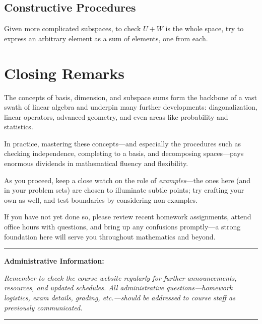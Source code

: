 \documentclass[11pt]{article}
\theoremstyle{definition}
\theoremstyle{plain}
\newenvironment{administrativeblock}
  {\begin{center}\begin{minipage}{0.95\linewidth}\color{blue}\hrule\vspace{2pt}\noindent\textbf{Administrative Information:}\par}
  {\vspace{2pt}\hrule\end{minipage}\end{center}}
\begin{document}
\subsection{Constructive Procedures}
Given more complicated subspaces, to check $U + W$ is the whole space, try to express an arbitrary element as a sum of elements, one from each.

\section*{Closing Remarks}

The concepts of basis, dimension, and subspace sums form the backbone of a vast swath of linear algebra and underpin many further developments: diagonalization, linear operators, advanced geometry, and even areas like probability and statistics.

In practice, mastering these concepts—and especially the procedures such as checking independence, completing to a basis, and decomposing spaces—pays enormous dividends in mathematical fluency and flexibility.

As you proceed, keep a close watch on the role of \emph{examples}—the ones here (and in your problem sets) are chosen to illuminate subtle points; try crafting your own as well, and test boundaries by considering non-examples.

If you have not yet done so, please review recent homework assignments, attend office hours with questions, and bring up any confusions promptly—a strong foundation here will serve you throughout mathematics and beyond.

\begin{administrativeblock}
\vspace{0.5em}
\textit{Remember to check the course website regularly for further announcements, resources, and updated schedules.
All administrative questions—homework logistics, exam details, grading, etc.—should be addressed to course staff as previously communicated.
}
\vspace{0.5em}
\end{administrativeblock}
\end{document}
